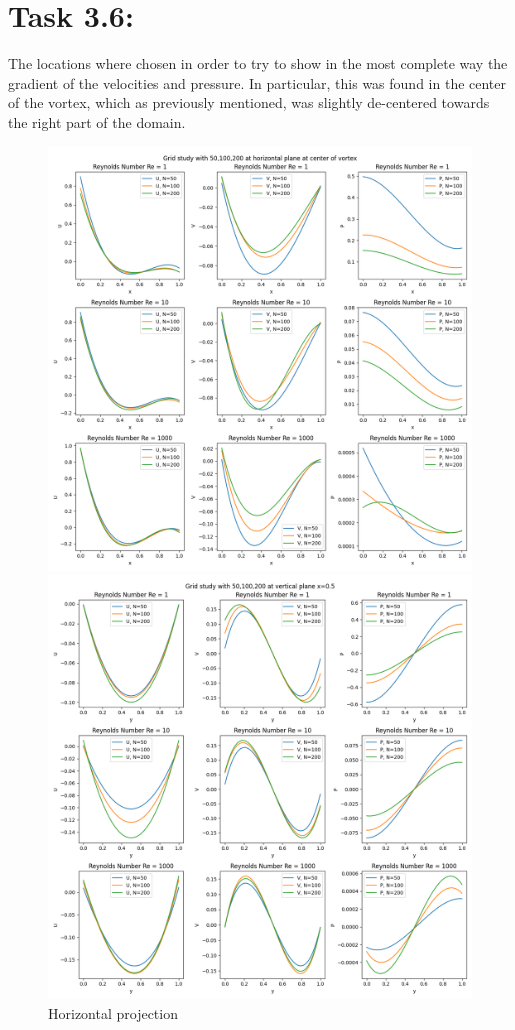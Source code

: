 \documentclass{article}
\begin{document}
\section*{\Large Task 3.6:}
The locations where chosen in order to try to show in the most complete way the gradient of the velocities and pressure. In particular, this was found in the center of the vortex, which as previously mentioned, was slightly de-centered towards the right part of the domain.
\begin{figure}[h!]
  \centering
  \begin{minipage}{0.49\textwidth}
    \centering
    \includegraphics[width=\textwidth]{horizontal_plane.png}
    \caption{Horizontal projection}
  \end{minipage}
  \hfill
  \begin{minipage}{0.49\textwidth}
    \centering
    \includegraphics[width=\textwidth]{vertical_plane.png}

\end{minipage}
\end{figure}
\end{document}
